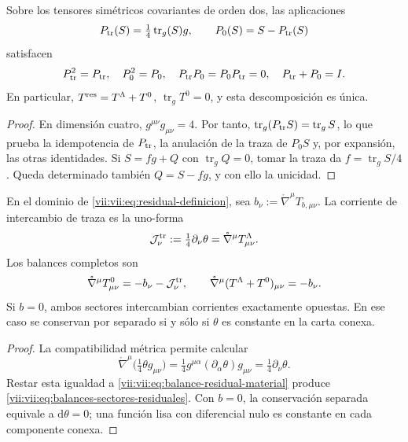 \begin{proposition}
\label{vii:vii:prop:proyectores-traza-residual}
Sobre los tensores simétricos covariantes de orden dos, las aplicaciones
\[
 P_{\rm tr}(S)=\tfrac14\operatorname{tr}_g(S)g,
 \qquad P_0(S)=S-P_{\rm tr}(S)
\]
satisfacen
\begin{equation}
 P_{\rm tr}^2=P_{\rm tr},\quad P_0^2=P_0,\quad
 P_{\rm tr}P_0=P_0P_{\rm tr}=0,\quad P_{\rm tr}+P_0=I.
 \label{vii:vii:eq:proyectores-traza-residual}
\end{equation}
En particular, \(T^{\rm res}=T^\Lambda+T^0\),
\(\operatorname{tr}_gT^0=0\), y esta descomposición es única.
\end{proposition}
\begin{proof}
En dimensión cuatro, \(g^{\mu\nu}g_{\mu\nu}=4\). Por tanto,
\(\operatorname{tr}_g(P_{\rm tr}S)=\operatorname{tr}_gS\), lo que
prueba la idempotencia de \(P_{\rm tr}\), la anulación de la traza
de \(P_0S\) y, por expansión, las otras identidades.
Si \(S=fg+Q\) con \(\operatorname{tr}_gQ=0\), tomar la traza
da \(f=\operatorname{tr}_gS/4\). Queda determinado también
\(Q=S-fg\), y con ello la unicidad.
\end{proof}

\begin{theorem}
\label{vii:vii:thm:intercambio-traza-residual}
En el dominio de \eqref{vii:vii:eq:residual-definicion}, sea
\(b_\nu:=\mathring\nabla^\mu T_{b,\mu\nu}\). La corriente
de intercambio de traza es la uno-forma
\begin{equation}
 \mathcal J^{\rm tr}_\nu
 :=\tfrac14\partial_\nu\theta
 =\mathring\nabla^\mu T^\Lambda_{\mu\nu}.
 \label{vii:vii:eq:corriente-intercambio-traza}
\end{equation}
Los balances completos son
\begin{equation}
 \mathring\nabla^\mu T^0_{\mu\nu}
       =-b_\nu-\mathcal J^{\rm tr}_\nu,
 \qquad
 \mathring\nabla^\mu(T^\Lambda+T^0)_{\mu\nu}=-b_\nu.
 \label{vii:vii:eq:balances-sectores-residuales}
\end{equation}
Si \(b=0\), ambos sectores intercambian corrientes exactamente opuestas.
En ese caso se conservan por separado si y sólo si \(\theta\) es
constante en la carta conexa.
\end{theorem}
\begin{proof}
La compatibilidad métrica permite calcular
\[
 \mathring\nabla^\mu\bigl(\tfrac14\theta g_{\mu\nu}\bigr)
 =\tfrac14g^{\mu\alpha}(\partial_\alpha\theta)g_{\mu\nu}
 =\tfrac14\partial_\nu\theta.
\]
Restar esta igualdad a \eqref{vii:vii:eq:balance-residual-material} produce
\eqref{vii:vii:eq:balances-sectores-residuales}. Con \(b=0\), la
conservación separada equivale a \(\mathrm d\theta=0\); una función
lisa con diferencial nulo es constante en cada componente conexa.
\end{proof}

